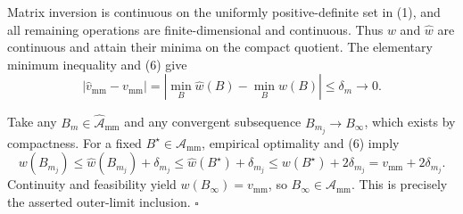 Matrix inversion is continuous on the uniformly positive-definite set in (1), and all remaining operations are finite-dimensional and continuous. Thus \(w\) and \(\widehat w\) are continuous and attain their minima on the compact quotient. The elementary minimum inequality and (6) give
\[
|\widehat v_{\mathrm{mm}}-v_{\mathrm{mm}}|
=\left|\min_B\widehat w(B)-\min_Bw(B)\right|
\le\delta_m\longrightarrow0. \tag{7}
\]

Take any \(B_m\in\widehat{\mathcal A}_{\mathrm{mm}}\) and any convergent subsequence \(B_{m_j}\to B_\infty\), which exists by compactness. For a fixed \(B^\star\in\mathcal A_{\mathrm{mm}}\), empirical optimality and (6) imply
\[
w(B_{m_j})
\le\widehat w(B_{m_j})+\delta_{m_j}
\le\widehat w(B^\star)+\delta_{m_j}
\le w(B^\star)+2\delta_{m_j}
=v_{\mathrm{mm}}+2\delta_{m_j}.
\]
Continuity and feasibility yield \(w(B_\infty)=v_{\mathrm{mm}}\), so \(B_\infty\in\mathcal A_{\mathrm{mm}}\). This is precisely the asserted outer-limit inclusion. \(\square\)